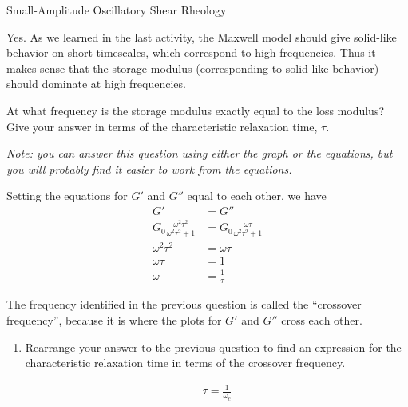\begin{activity}[extension]{Small-Amplitude Oscillatory Shear Rheology}
\begin{ctqs}
\begin{enumerate}
				\begin{solution}[2in]{}
				
					Yes. As we learned in the last activity, the Maxwell model should give solid-like behavior on short timescales, which correspond to high frequencies.  Thus it makes sense that the storage modulus (corresponding to solid-like behavior) should dominate at high frequencies.
				
				\end{solution}
	\end{enumerate}

	\question At what frequency is the storage modulus exactly equal to the loss modulus?  Give your answer in terms of the characteristic relaxation time, $\tau$.
	
		\emph{Note: you can answer this question using either the graph or the equations, but you will probably find it easier to work from the equations.}
	
					\begin{solution}[1.75in]{}
					
						Setting the equations for $G'$ and $G''$ equal to each other, we have
						\begin{align*}
							G' &= G''\\
							G_0 \frac{\omega^2 \tau^2}{\omega^2 \tau^2 + 1} &= G_0 \frac{\omega \tau}{\omega^2 \tau^2 + 1}\\
							\omega^2 \tau^2 &= \omega \tau\\
							\omega\tau &= 1\\
							\omega &= \frac{1}{\tau}
						\end{align*}
					\end{solution}
	
	\question The frequency identified in the previous question is called the ``crossover frequency'', because it is where the plots for $G'$ and $G''$ cross each other.
	
		\begin{enumerate}
			\item Rearrange your answer to the previous question to find an expression for the characteristic relaxation time in terms of the crossover frequency.
	
					\begin{solution}[1in]{}
					
						\begin{align*}
							\tau = \frac{1}{\omega_c}
						\end{align*}
					\end{solution}
					

\end{enumerate}
\end{ctqs}
\end{activity}
